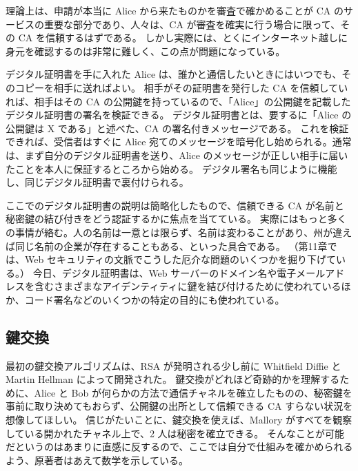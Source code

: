 \documentclass[uplatex]{jsarticle}
\def\label#1{}%
\begin{document}
理論上は、申請が本当に Alice から来たものかを審査で確かめることが CA のサービスの重要な部分であり、人々は、CA が審査を確実に行う場合に限って、その CA を信頼するはずである。
しかし実際には、とくにインターネット越しに身元を確認するのは非常に難しく、この点が問題になっている。

デジタル証明書を手に入れた Alice は、誰かと通信したいときにはいつでも、そのコピーを相手に送ればよい。
相手がその証明書を発行した CA を信頼していれば、相手はその CA の公開鍵を持っているので、「Alice」の公開鍵を記載したデジタル証明書の署名を検証できる。
デジタル証明書とは、要するに「Alice の公開鍵は X である」と述べた、CA の署名付きメッセージである。
これを検証できれば、受信者はすぐに Alice 宛てのメッセージを暗号化し始められる。通常は、まず自分のデジタル証明書を送り、Alice のメッセージが正しい相手に届いたことを本人に保証するところから始める。
デジタル署名も同じように機能し、同じデジタル証明書で裏付けられる。

\begin{rem}[デジタル証明書の実際の複雑さ]\label{rem:ch5-certificate-complications}
ここでのデジタル証明書の説明は簡略化したもので、信頼できる CA が名前と秘密鍵の結び付きをどう認証するかに焦点を当てている。
実際にはもっと多くの事情が絡む。人の名前は一意とは限らず、名前は変わることがあり、州が違えば同じ名前の企業が存在することもある、といった具合である。
（第11章では、Web セキュリティの文脈でこうした厄介な問題のいくつかを掘り下げている。）
今日、デジタル証明書は、Web サーバーのドメイン名や電子メールアドレスを含むさまざまなアイデンティティに鍵を結び付けるために使われているほか、コード署名などのいくつかの特定の目的にも使われている。
\end{rem}

\subsection{鍵交換}

最初の鍵交換アルゴリズムは、RSA が発明される少し前に Whitfield Diffie と Martin Hellman によって開発された。
鍵交換がどれほど奇跡的かを理解するために、Alice と Bob が何らかの方法で通信チャネルを確立したものの、秘密鍵を事前に取り決めてもおらず、公開鍵の出所として信頼できる CA すらない状況を想像してほしい。
信じがたいことに、鍵交換を使えば、Mallory がすべてを観察している開かれたチャネル上で、2 人は秘密を確立できる。
そんなことが可能だというのはあまりに直感に反するので、ここでは自分で仕組みを確かめられるよう、原著者はあえて数学を示している。
\end{document}
